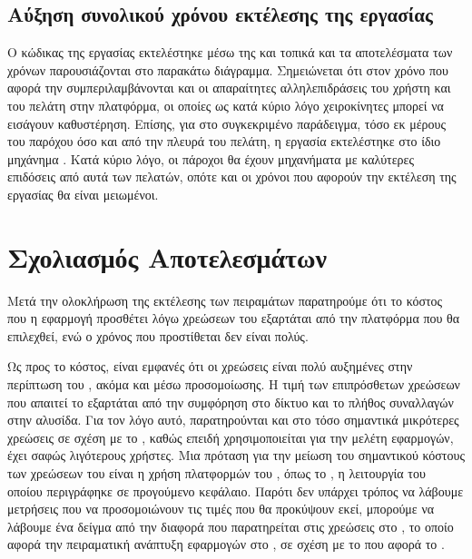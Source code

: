 \subsection{Αύξηση συνολικού χρόνου εκτέλεσης της εργασίας}
Ο κώδικας της εργασίας εκτελέστηκε μέσω της  και τοπικά και τα αποτελέσματα των χρόνων  παρουσιάζονται στο παρακάτω διάγραμμα. Σημειώνεται ότι στον χρόνο που αφορά την  συμπεριλαμβάνονται και οι απαραίτητες αλληλεπιδράσεις του χρήστη και του πελάτη στην πλατφόρμα, οι οποίες ως κατά κύριο λόγο χειροκίνητες μπορεί να εισάγουν καθυστέρηση. Επίσης, για στο συγκεκριμένο παράδειγμα, τόσο εκ μέρους του παρόχου όσο και από την πλευρά του πελάτη, η εργασία εκτελέστηκε στο ίδιο μηχάνημα . Κατά κύριο λόγο, οι πάροχοι θα έχουν μηχανήματα με καλύτερες επιδόσεις από αυτά των πελατών, οπότε και οι χρόνοι που αφορούν την εκτέλεση της εργασίας θα είναι μειωμένοι. 


\begin{center}

    \end{center}

\section{Σχολιασμός Αποτελεσμάτων}
Μετά την ολοκλήρωση της εκτέλεσης των πειραμάτων παρατηρούμε ότι το κόστος που η εφαρμογή προσθέτει λόγω χρεώσεων του  εξαρτάται από την πλατφόρμα που θα επιλεχθεί, ενώ ο χρόνος που προστίθεται δεν είναι πολύς.

Ως προς το κόστος, είναι εμφανές ότι οι χρεώσεις είναι πολύ αυξημένες στην περίπτωση του , ακόμα και μέσω προσομοίωσης. Η τιμή των επιπρόσθετων χρεώσεων που απαιτεί το  εξαρτάται από την συμφόρηση στο δίκτυο και το πλήθος συναλλαγών στην αλυσίδα. Για τον λόγο αυτό, παρατηρούνται και στο  τόσο σημαντικά μικρότερες χρεώσεις σε σχέση με το , καθώς επειδή χρησιμοποιείται για την μελέτη εφαρμογών, έχει σαφώς λιγότερους χρήστες. Μια πρόταση για την μείωση του σημαντικού κόστους των χρεώσεων του  είναι η χρήση πλατφορμών του , όπως το , η λειτουργία του οποίου περιγράφηκε σε προγούμενο κεφάλαιο. Παρότι δεν υπάρχει τρόπος να λάβουμε μετρήσεις που να προσομοιώνουν τις τιμές που θα προκύψουν εκεί, μπορούμε να λάβουμε ένα δείγμα από την διαφορά που παρατηρείται στις χρεώσεις στο , το οποίο αφορά την πειραματική ανάπτυξη εφαρμογών στο , σε σχέση με το  που αφορά το .

